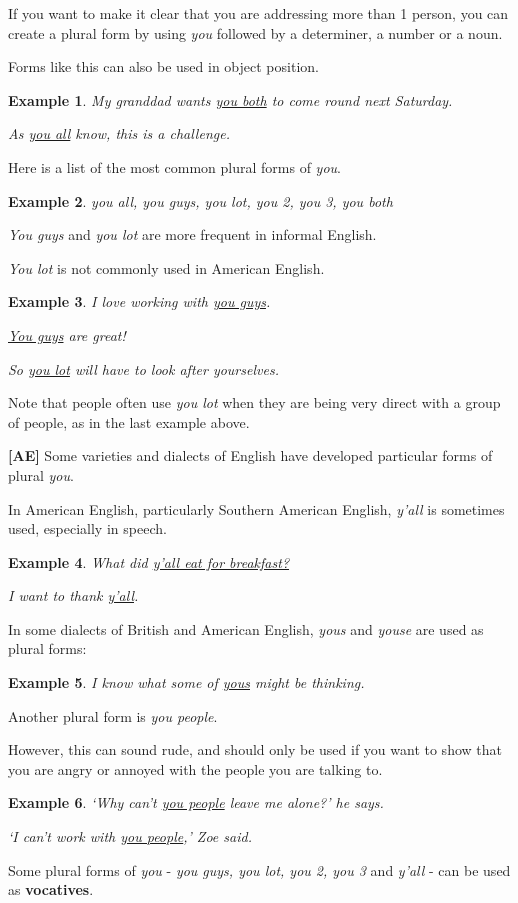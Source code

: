 \documentclass[oneside]{book}
\numberwithin{equation}{section}
\newtheorem{example}{Example}[section]
\begin{document}
%
If you want to make it clear that you are addressing more than 1 person, you can create a plural form by using \textit{you} followed by a determiner, a number or a noun.

Forms like this can also be used in object position.
\begin{example}
    My granddad wants \underline{you both} to come round next Saturday.
    
    As \underline{you all} know, this is a challenge.
\end{example}
Here is a list of the most common plural forms of \textit{you}.
\begin{example}
    you all, you guys, you lot, you 2, you 3, you both
\end{example}
\textit{You guys} and \textit{you lot} are more frequent in informal English.

\textit{You lot} is not commonly used in American English.
\begin{example}
    I love working with \underline{you guys}.
    
    \underline{You guys} are great!
    
    So \underline{you lot} will have to look after yourselves.
\end{example}
Note that people often use \textit{you lot} when they are being very direct with a group of people, as in the last example above.

%
\textbf{[AE]} Some varieties and dialects of English have developed particular forms of plural \textit{you}.

In American English, particularly Southern American English, \textit{y'all} is sometimes used, especially in speech.
\begin{example}
    What did \underline{y'all eat for breakfast?}
    
    I want to thank \underline{y'all}.
\end{example}
In some dialects of British and American English, \textit{yous} and \textit{youse} are used as plural forms:
\begin{example}
    I know what some of \underline{yous} might be thinking.
\end{example}
Another plural form is \textit{you people}.

However, this can sound rude, and should only be used if you want to show that you are angry or annoyed with the people you are talking to.
\begin{example}
    `Why can't \underline{you people} leave me alone?' he says.
    
    `I can't work with \underline{you people},' Zoe said.
\end{example}
Some plural forms of \textit{you} - \textit{you guys, you lot, you 2, you 3} and \textit{y'all} - can be used as \textbf{vocatives}.
\end{document}
